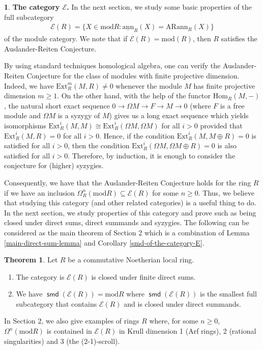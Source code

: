 \documentclass[12pt]{amsart}
\newcommand{\Ext}{\mathrm{Ext}}
\newcommand{\Hom}{\mathrm{Hom}}
\newcommand{\sann}{\underline{\mathrm{ann}}}
\newcommand{\arann}{\mathrm{ARann}}
\newcommand{\module}{\mathrm{mod}}
\newcommand{\EE}{\mathcal{E}}
\theoremstyle{definition}
\newtheorem{chunk}[theorem]{}
\newtheorem{introtheorem}{Theorem}
\numberwithin{equation}{theorem}
\def\smd{\operatorname{\mathsf{smd}}}
\begin{document}
\begin{chunk}\label{introduction-the-category-e}
    \textbf{The category $\EE$.} In the next section, we study some basic properties of the full subcategory 
    \begin{align*}
        \EE(R) = \{ X \in \module R \colon \sann_R(X) = \arann_R(X) \} 
    \end{align*}
    of the module category. We note that if $\EE(R) = \module(R)$, then $R$ satisfies the Auslander-Reiten Conjecture. 
    
    By using standard techniques homological algebra, one can verify the Auslander-Reiten Conjecture for the class of modules with finite projective dimension. Indeed, we have $\Ext_R^{m}(M, R) \neq 0$ whenever the module $M$ has finite projective dimension $m \geq 1$. On the other hand, with the help of the functor $\Hom_R(M,-)$, the natural short exact sequence $ 0 \to \Omega M \to F \to M \to 0$ (where $F$ is a free module and $\Omega M$ is a syzygy of $M$) gives us a long exact sequence which yields isomorphisms $\Ext_R^i(M,M) \cong \Ext_R^i(\Omega M, \Omega M)$ for all $i > 0$ provided that $\Ext_R^i(M,R) = 0$ for all $i > 0$. Hence, if the condition $\Ext_R^i(M, M \oplus R) = 0$ is satisfied for all $i>0$, then the condition $\Ext_R^i(\Omega M, \Omega M \oplus R) = 0$ is also satisfied for all $i > 0$. Therefore, by induction, it is enough to consider the conjecture for (higher) syzygies. 
    
    Consequently, we have that the Auslander-Reiten Conjecture holds for the ring $R$ if we have an inclusion $\Omega_R^n(\module R) \subseteq \EE(R)$ for some $n \geq 0$. Thus, we believe that studying this category (and other related categories) is a useful thing to do. In the next section, we study properties of this category and prove such as being closed under direct sums, direct summands and syzygies. The following can be considered as the main theorem of Section 2 which is a combination of Lemma \ref{main-direct-sum-lemma} and Corollary \ref{smd-of-the-category-E}.
    \begin{introtheorem}
        Let $R$ be a commutative Noetherian local ring.
        \begin{enumerate}
            \item The category is $\EE(R)$ is closed under finite direct sums.
            \item We have $\smd(\EE(R)) = \module R$ where $\smd(\EE(R))$ is the smallest full subcategory that contains $\EE(R)$ and is closed under direct summands.
        \end{enumerate}
    \end{introtheorem}
\end{chunk}
In Section 2, we also give examples of rings $R$ where, for some $n \geq 0$, $\Omega^n(\module R)$ is contained in $\EE(R)$ in Krull dimension 1 (Arf rings), 2 (rational singularities) and 3 (the (2-1)-scroll). 
\end{document}
